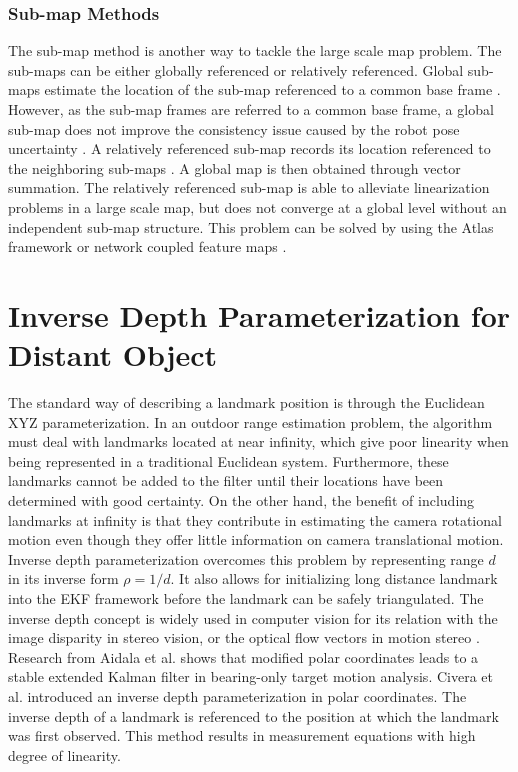 \subsubsection{Sub-map Methods}
The sub-map method is another way to tackle the large scale map problem.
The sub-maps can be either globally referenced or relatively
referenced. Global sub-maps estimate the location of the sub-map
referenced to a common base frame \cite{estrada_hierarchical_2005}
\cite{leonard_consistent_2003}. However, as the sub-map frames are
referred to a common base frame, a global sub-map does not improve the
consistency issue caused by the robot pose
uncertainty \cite{bailey_simultaneous_2006}. A relatively referenced
sub-map records its location referenced to the neighboring sub-maps
\cite{chong_feature-based_1999} \cite{williams_efficient_2001}. A global
map is then obtained through vector summation. The relatively
referenced sub-map is able to alleviate linearization problems in a large
scale map, but does not converge at a global level without an
independent sub-map structure. This problem can be solved by using
the Atlas framework or network coupled feature maps \cite{bosse_slam_2004}
\cite{bailey_mobile_2002}.

\section{Inverse Depth Parameterization for Distant Object}
The standard way of describing a landmark position is through the
Euclidean XYZ parameterization. In an outdoor range estimation
problem, the algorithm must deal with landmarks located at near
infinity, which give poor linearity when being represented in a
traditional Euclidean system. Furthermore, these landmarks cannot be
added to the filter until their locations have been determined with
good certainty. On the other hand, the benefit of including landmarks
at infinity is that they contribute in estimating the camera
rotational motion even though they offer little information on camera
translational motion. Inverse depth parameterization overcomes this
problem by representing range $d$ in its inverse form $\rho =1/d$. It
also allows for initializing long distance landmark into the EKF
framework before the landmark can be safely triangulated. The inverse
depth concept is widely used in computer vision for its relation with
the image disparity in stereo vision, or the optical flow vectors in
motion stereo \cite{okutomi_multiple-baseline_1991}
\cite{jepson_fast_1991} \cite{chowdhury_stochastic_2003}. Research
from Aidala et al. \cite{aidala_utilization_1983} shows that modified
polar coordinates leads to a stable extended Kalman filter in
bearing-only target motion analysis. Civera et al.
\cite{civera_inverse_2008} introduced an inverse depth
parameterization in polar coordinates. The inverse depth of a landmark
is referenced to the position at which the landmark was first
observed. This method results in measurement equations with high
degree of linearity.





